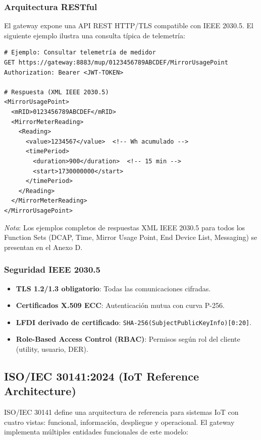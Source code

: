 \subsubsection{Arquitectura RESTful}

El gateway expone una API REST HTTP/TLS compatible con IEEE 2030.5. El siguiente ejemplo ilustra una consulta típica de telemetría:

\begin{verbatim}
# Ejemplo: Consultar telemetría de medidor
GET https://gateway:8883/mup/0123456789ABCDEF/MirrorUsagePoint
Authorization: Bearer <JWT-TOKEN>

# Respuesta (XML IEEE 2030.5)
<MirrorUsagePoint>
  <mRID>0123456789ABCDEF</mRID>
  <MirrorMeterReading>
    <Reading>
      <value>1234567</value>  <!-- Wh acumulado -->
      <timePeriod>
        <duration>900</duration>  <!-- 15 min -->
        <start>1730000000</start>
      </timePeriod>
    </Reading>
  </MirrorMeterReading>
</MirrorUsagePoint>
\end{verbatim}

\textit{Nota}: Los ejemplos completos de respuestas XML IEEE 2030.5 para todos los Function Sets (DCAP, Time, Mirror Usage Point, End Device List, Messaging) se presentan en el Anexo D.

\subsubsection{Seguridad IEEE 2030.5}

\begin{itemize}
    \item \textbf{TLS 1.2/1.3 obligatorio}: Todas las comunicaciones cifradas.
    \item \textbf{Certificados X.509 ECC}: Autenticación mutua con curva P-256.
    \item \textbf{LFDI derivado de certificado}: \texttt{SHA-256(SubjectPublicKeyInfo)[0:20]}.
    \item \textbf{Role-Based Access Control (RBAC)}: Permisos según rol del cliente (utility, usuario, DER).
\end{itemize}

\subsection{ISO/IEC 30141:2024 (IoT Reference Architecture)}

ISO/IEC 30141 define una arquitectura de referencia para sistemas IoT con cuatro vistas: funcional, información, despliegue y operacional. El gateway implementa múltiples entidades funcionales de este modelo:

